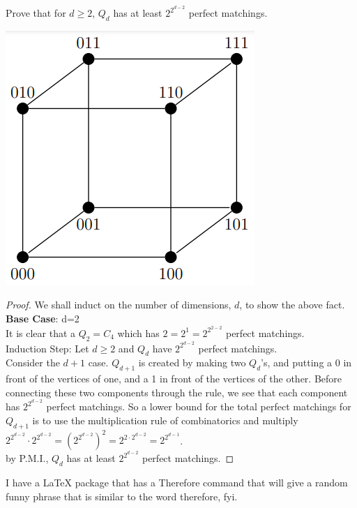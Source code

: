 \documentclass[12pt]{article}
\begin{document}
\begin{enumerate}
  Prove that for $d \geq 2$, $Q_d$ has at least $2^{2^{d-2}}$ perfect matchings. 
\begin{center}
\includegraphics[scale=.5]{Q3.png}
\end{center}
\begin{proof}
	We shall induct on the number of dimensions, $d$, to show the above fact.\\
	\textbf{Base Case}: d=2\\
	It is clear that a $Q_2 = C_4$ which has $2 = 2^1 = 2^{2^{2-2}}$ perfect matchings.\\
	Induction Step: Let $d\geq2$ and $Q_d$ have $2^{2^{d-2}}$ perfect matchings.\\ 
	Consider the $d+1$ case. $Q_{d+1}$ is created by making two $Q_d$'s, and putting a 0 in front of the vertices of one, and a 1 in front of the vertices of the other. Before connecting these two components through the rule, we see that each component has $2^{2^{d-2}}$ perfect matchings. So a lower bound for the total perfect matchings for $Q_{d+1}$ is to use the multiplication rule of combinatorics and multiply $2^{2^{d-2}}\cdot2^{2^{d-2}} = (2^{2^{d-2}})^2 = 2^{2\cdot2^{d-2}} = 2^{2^{d-1}}$.\\
	\Therefore by P.M.I., $Q_d$ has at least $2^{2^{d-2}}$ perfect matchings.
\end{proof}
\end{enumerate}
\vspace{3cm} I have a LaTeX package that has a Therefore command that will give a random funny phrase that is similar to the word therefore, fyi.
\end{document}
